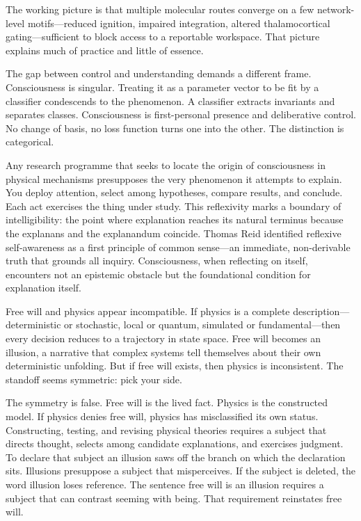 The working picture is that multiple molecular routes converge on a few network-level motifs—reduced ignition, impaired integration, altered thalamocortical gating—sufficient to block access to a reportable workspace. That picture explains much of practice and little of essence.

The gap between control and understanding demands a different frame. Consciousness is singular. Treating it as a parameter vector to be fit by a classifier condescends to the phenomenon. A classifier extracts invariants and separates classes. Consciousness is first-personal presence and deliberative control. No change of basis, no loss function turns one into the other. The distinction is categorical.

Any research programme that seeks to locate the origin of consciousness in physical mechanisms presupposes the very phenomenon it attempts to explain. You deploy attention, select among hypotheses, compare results, and conclude. Each act exercises the thing under study. This reflexivity marks a boundary of intelligibility: the point where explanation reaches its natural terminus because the explanans and the explanandum coincide. Thomas Reid identified reflexive self-awareness as a first principle of common sense—an immediate, non-derivable truth that grounds all inquiry. Consciousness, when reflecting on itself, encounters not an epistemic obstacle but the foundational condition for explanation itself.

Free will and physics appear incompatible. If physics is a complete description—deterministic or stochastic, local or quantum, simulated or fundamental—then every decision reduces to a trajectory in state space. Free will becomes an illusion, a narrative that complex systems tell themselves about their own deterministic unfolding. But if free will exists, then physics is inconsistent. The standoff seems symmetric: pick your side.

The symmetry is false. Free will is the lived fact. Physics is the constructed model. If physics denies free will, physics has misclassified its own status. Constructing, testing, and revising physical theories requires a subject that directs thought, selects among candidate explanations, and exercises judgment. To declare that subject an illusion saws off the branch on which the declaration sits. Illusions presuppose a subject that misperceives. If the subject is deleted, the word \QSOpen{}illusion\QSClose{} loses reference. The sentence \QSOpen{}free will is an illusion\QSClose{} requires a subject that can contrast seeming with being. That requirement reinstates free will.

